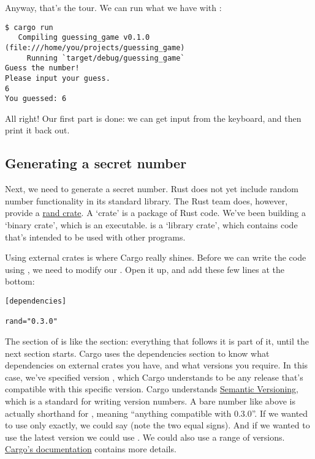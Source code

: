 \blank

Anyway, that’s the tour. We can run what we have with :

\begin{verbatim}
$ cargo run
   Compiling guessing_game v0.1.0 (file:///home/you/projects/guessing_game)
     Running `target/debug/guessing_game`
Guess the number!
Please input your guess.
6
You guessed: 6
\end{verbatim}

All right! Our first part is done: we can get input from the keyboard, and then print it back out.

\subsection{Generating a secret number}

Next, we need to generate a secret number. Rust does not yet include random number functionality in its standard library. 
The Rust team does, however, provide a \href{https://crates.io/crates/rand}{rand crate}. A ‘crate’ is a package of Rust 
code. We’ve been building a ‘binary crate’, which is an executable.  is a ‘library crate’, which contains code 
that’s intended to be used with other programs.

\blank

Using external crates is where Cargo really shines. Before we can write the code using , we need to modify our 
. Open it up, and add these few lines at the bottom:

\begin{verbatim}
[dependencies]

rand="0.3.0"
\end{verbatim}

The \code{[dependencies]} section of  is like the \code{[package]} section: everything that follows it is part 
of it, until the next section starts. Cargo uses the dependencies section to know what dependencies on external crates you have, 
and what versions you require. In this case, we’ve specified version , which Cargo understands to be any release that’s
compatible with this specific version. Cargo understands \href{http://semver.org/}{Semantic Versioning}, which is a standard for
writing version numbers. A bare number like above is actually shorthand for , meaning \enquote{anything compatible 
with 0.3.0}. If we wanted to use only  exactly, we could say  (note the two equal signs). And if we
wanted to use the latest version we could use \code{*}. We could also use a range of versions. 
\href{http://doc.crates.io/crates-io.html}{Cargo’s documentation} contains more details.

